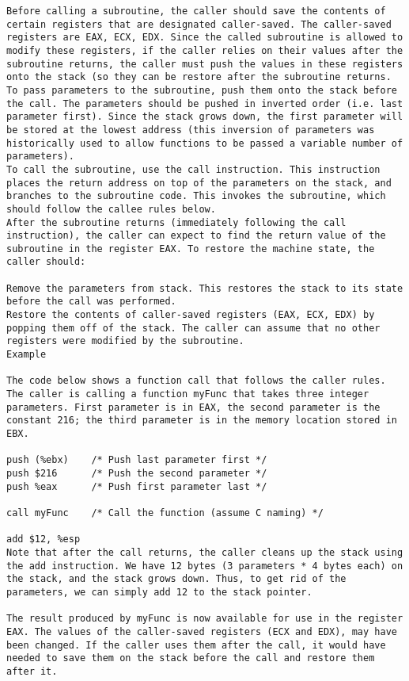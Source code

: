 \documentclass[10pt]{article}
\begin{document}
{\begin{multicols*}{5}
\begin{lstlisting}[breaklines=true,columns=fullflexible]
Before calling a subroutine, the caller should save the contents of certain registers that are designated caller-saved. The caller-saved registers are EAX, ECX, EDX. Since the called subroutine is allowed to modify these registers, if the caller relies on their values after the subroutine returns, the caller must push the values in these registers onto the stack (so they can be restore after the subroutine returns.
To pass parameters to the subroutine, push them onto the stack before the call. The parameters should be pushed in inverted order (i.e. last parameter first). Since the stack grows down, the first parameter will be stored at the lowest address (this inversion of parameters was historically used to allow functions to be passed a variable number of parameters).
To call the subroutine, use the call instruction. This instruction places the return address on top of the parameters on the stack, and branches to the subroutine code. This invokes the subroutine, which should follow the callee rules below.
After the subroutine returns (immediately following the call instruction), the caller can expect to find the return value of the subroutine in the register EAX. To restore the machine state, the caller should:

Remove the parameters from stack. This restores the stack to its state before the call was performed.
Restore the contents of caller-saved registers (EAX, ECX, EDX) by popping them off of the stack. The caller can assume that no other registers were modified by the subroutine.
Example

The code below shows a function call that follows the caller rules. The caller is calling a function myFunc that takes three integer parameters. First parameter is in EAX, the second parameter is the constant 216; the third parameter is in the memory location stored in EBX.

push (%ebx)    /* Push last parameter first */
push $216      /* Push the second parameter */
push %eax      /* Push first parameter last */

call myFunc    /* Call the function (assume C naming) */

add $12, %esp
Note that after the call returns, the caller cleans up the stack using the add instruction. We have 12 bytes (3 parameters * 4 bytes each) on the stack, and the stack grows down. Thus, to get rid of the parameters, we can simply add 12 to the stack pointer.

The result produced by myFunc is now available for use in the register EAX. The values of the caller-saved registers (ECX and EDX), may have been changed. If the caller uses them after the call, it would have needed to save them on the stack before the call and restore them after it.


\end{lstlisting}
\end{multicols*}}
\end{document}
